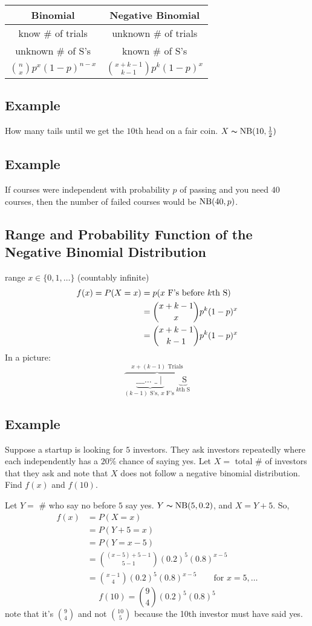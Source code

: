 \begin{center}
    \begin{tabular}{|c|c|}
        \hline
        Binomial & Negative Binomial \\
        \hline
        know \# of trials & unknown \# of trials\\
        unknown \# of S's & known \# of S's\\
        $ \binom{n}{x}p^x(1-p)^{n-x} $ & 
        $ \binom{x+k-1}{k-1}p^k(1-p)^x $\\
        \hline
    \end{tabular}
\end{center}

\subsection{Example}
How many tails until we get the $10$th head on a fair coin.
$ X\thicksim\operatorname{NB}(10,\frac{1}{2}) $

\subsection{Example}
If courses were independent with probability $ p $ of passing
and you need $ 40 $ courses, then the number of failed courses
would be $ \operatorname{NB}(40,p) $.

\subsection{Range and Probability Function of the Negative Binomial Distribution}
range $ x\in\{0,1,\dots\} $ (countably infinite)
\begin{align*}
    f(x)=P(X=x)
    &=p(x\text{ F's before $ k $th S})\\
    &=\binom{x+k-1}{x}p^k(1-p)^x\\
    &=\binom{x+k-1}{k-1}p^k(1-p)^x
\end{align*}
In a picture:
\[\overbrace{\underbrace{\text{\_ \_ \_ $\ldots$ \_}\mid}_
{(k-1) \text{ S's, }x \text{ F's }}
\underbrace{\text{ S}}_{k\text{th S}}}^{x+(k-1)\text{ Trials}}\]

\subsection{Example}
Suppose a startup is looking for $ 5 $ investors. They ask
investors repeatedly where each independently has a $ 20\% $ chance
of saying yes. Let $ X= $ total \# of investors that they ask and
note that $ X $ does not follow a negative binomial distribution.
Find $ f(x) $ and $ f(10) $.

Let $ Y= $ \# who say no before $ 5 $ say yes.
$ Y\thicksim\operatorname{NB}(5,0.2) $, and $ X=Y+5 $. So,
\begin{align*}
    f(x)&=P(X=x)\\
    &=P(Y+5=x)\\
    &=P(Y=x-5)\\
    &=\binom{(x-5)+5-1}{5-1}(0.2)^5(0.8)^{x-5}\\
    &=\binom{x-1}{4}(0.2)^5(0.8)^{x-5} \qquad \text{for } x=5,\ldots
\end{align*}
\[ f(10)=\binom{9}{4}(0.2)^5(0.8)^5 \]
note that it's $ \binom{9}{4} $ and not $ \binom{10}{5} $ because
the 10th investor must have said yes.